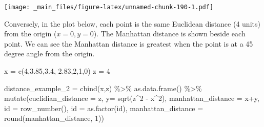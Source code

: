 \documentclass[
]{book}
\newenvironment{Shaded}{\begin{snugshade}}{\end{snugshade}}
\newcommand{\AttributeTok}[1]{\textcolor[rgb]{0.77,0.63,0.00}{#1}}
\newcommand{\DecValTok}[1]{\textcolor[rgb]{0.00,0.00,0.81}{#1}}
\newcommand{\FloatTok}[1]{\textcolor[rgb]{0.00,0.00,0.81}{#1}}
\newcommand{\FunctionTok}[1]{\textcolor[rgb]{0.00,0.00,0.00}{#1}}
\newcommand{\NormalTok}[1]{#1}
\newcommand{\OtherTok}[1]{\textcolor[rgb]{0.56,0.35,0.01}{#1}}
\newcommand{\SpecialCharTok}[1]{\textcolor[rgb]{0.00,0.00,0.00}{#1}}
\begin{document}
\texttt{[image: \_main\_files/figure-latex/unnamed-chunk-190-1.pdf]}

Conversely, in the plot below, each point is the same Euclidean distance (4 units) from the origin (\(x=0,y=0\)). The Manhattan distance is shown beside each point. We can see the Manhattan distance is greatest when the point is at a 45 degree angle from the origin.

\begin{Shaded}
\begin{Highlighting}[]
\NormalTok{x }\OtherTok{=} \FunctionTok{c}\NormalTok{(}\DecValTok{4}\NormalTok{,}\FloatTok{3.85}\NormalTok{,}\FloatTok{3.4}\NormalTok{, }\FloatTok{2.83}\NormalTok{,}\DecValTok{2}\NormalTok{,}\DecValTok{1}\NormalTok{,}\DecValTok{0}\NormalTok{)}
\NormalTok{z }\OtherTok{=} \DecValTok{4}

\NormalTok{distance\_example\_2 }\OtherTok{=} \FunctionTok{cbind}\NormalTok{(x,z) }\SpecialCharTok{\%\textgreater{}\%}
  \FunctionTok{as.data.frame}\NormalTok{() }\SpecialCharTok{\%\textgreater{}\%}
  \FunctionTok{mutate}\NormalTok{(}\AttributeTok{euclidian\_distance =}\NormalTok{ z,}
         \AttributeTok{y=} \FunctionTok{sqrt}\NormalTok{(z}\SpecialCharTok{\^{}}\DecValTok{2} \SpecialCharTok{{-}}\NormalTok{  x}\SpecialCharTok{\^{}}\DecValTok{2}\NormalTok{),}
         \AttributeTok{manhattan\_distance =}\NormalTok{ x}\SpecialCharTok{+}\NormalTok{y,}
         \AttributeTok{id =} \FunctionTok{row\_number}\NormalTok{(),}
         \AttributeTok{id =} \FunctionTok{as.factor}\NormalTok{(id),}
         \AttributeTok{manhattan\_distance =} \FunctionTok{round}\NormalTok{(manhattan\_distance, }\DecValTok{1}\NormalTok{))}


\end{Highlighting}
\end{Shaded}
\end{document}
